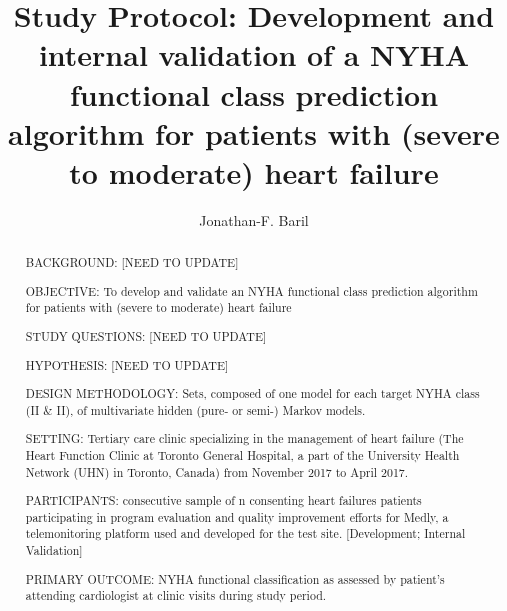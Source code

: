 \documentclass[]{article}
\title{Study Protocol:
	\linebreak
	Development and internal validation of a NYHA functional class prediction algorithm for patients with (severe to moderate) heart failure}  %
\author{Jonathan-F. Baril}
\begin{document}
\maketitle

\begin{abstract} %
\noindent BACKGROUND: [NEED TO UPDATE]

\noindent OBJECTIVE: To develop and validate an NYHA functional class prediction algorithm for patients with (severe to moderate) heart failure

\noindent STUDY QUESTIONS: [NEED TO UPDATE]

\noindent HYPOTHESIS: [NEED TO UPDATE]

\noindent DESIGN METHODOLOGY: Sets, composed of one model for each target NYHA class (II \& II), of multivariate hidden (pure- or semi-) Markov models. 

\noindent SETTING: Tertiary care clinic specializing in the management of heart failure (The Heart Function Clinic at Toronto General Hospital, a part of the University Health Network (UHN) in Toronto, Canada) from November 2017 to April 2017.

\noindent PARTICIPANTS: consecutive sample of {n} consenting heart failures patients participating in program evaluation and quality improvement efforts for Medly, a telemonitoring platform used and developed for the test site.  [Development; Internal Validation]

\noindent PRIMARY OUTCOME: NYHA functional classification as assessed by patient's attending cardiologist at clinic visits during study period.


\end{abstract}
\end{document}
